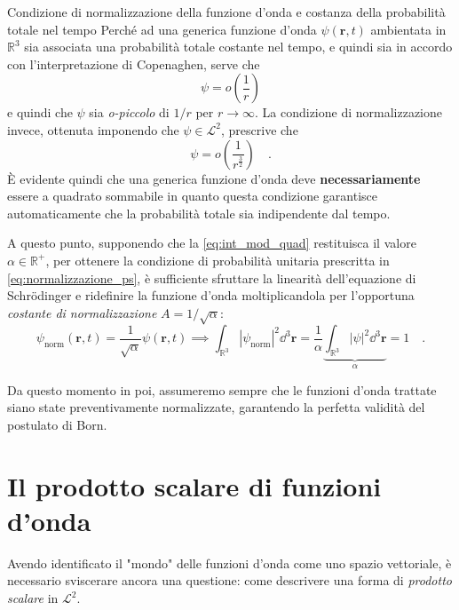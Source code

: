 \begin{concettochiave}{Condizione di normalizzazione della funzione d'onda e costanza della probabilità totale nel tempo}
    \noindent
    Perché ad una generica funzione d'onda $\psi(\bm{r},t)$ ambientata in $\mathbb{R}^3$ sia associata una probabilità totale costante nel tempo, e quindi sia in accordo con l'interpretazione di Copenaghen, serve che 
    \[
        \psi = o\left(\frac{1}{r} \right)
    \] 
    e quindi che $\psi$ sia \emph{o-piccolo} di $1/r$ per $r \to \infty$.
    La condizione di normalizzazione invece, ottenuta imponendo che $\psi \in \mathcal{L}^2$, prescrive che 
    \[
        \psi = {o}\left(\frac{1}{r^{\frac{3}{2}}} \right) \quad.
    \]
    È evidente quindi che una generica funzione d'onda deve \textbf{necessariamente} essere a quadrato sommabile in quanto questa condizione garantisce automaticamente che la probabilità totale sia indipendente dal tempo.
\end{concettochiave}

\noindent
A questo punto, supponendo che la \eqref{eq:int_mod_quad} restituisca il valore $\alpha \in \mathbb{R}^+$, per ottenere la condizione di probabilità unitaria prescritta in \eqref{eq:normalizzazione_ps}, è sufficiente sfruttare la linearità dell'equazione di Schrödinger e ridefinire la funzione d'onda moltiplicandola per l'opportuna \emph{costante di normalizzazione} $A = 1/\sqrt{\alpha}$:
\[
    \psi_{\text{norm}}(\bm{r}, t) = \frac{1}{\sqrt{\alpha}} \psi(\bm{r}, t) \implies \int_{\mathbb{R}^3} |\psi_{\text{norm}}|^2 \dd^3{\bm{r}} = \frac{1}{\alpha} \underbrace{\int_{\mathbb{R}^3} |\psi|^2 \dd^3{\bm{r}}}_{\alpha} = 1 \quad.
\]

Da questo momento in poi, assumeremo sempre che le funzioni d'onda trattate siano state preventivamente normalizzate, garantendo la perfetta validità del postulato di Born.

\section{Il prodotto scalare di funzioni d'onda}
Avendo identificato il "mondo" delle funzioni d'onda come uno spazio vettoriale, è necessario sviscerare ancora una questione: come descrivere una forma di \textit{prodotto scalare} in $\mathcal{L}^2$.

